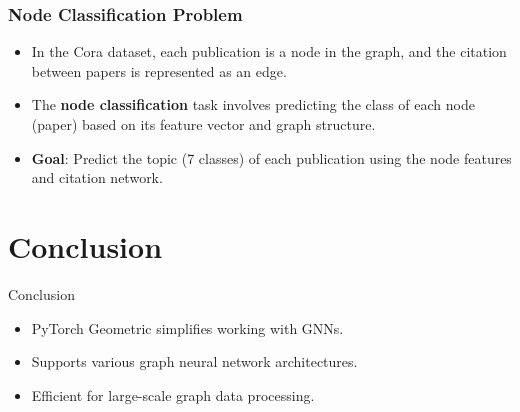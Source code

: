 \documentclass{beamer}
\begin{document}
\begin{frame}
\frametitle{Node Classification Problem}

\begin{itemize}
    \item In the Cora dataset, each publication is a node in the graph, and the citation between papers is represented as an edge.
    \item The \textbf{node classification} task involves predicting the class of each node (paper) based on its feature vector and graph structure.
    \item \textbf{Goal}: Predict the topic (7 classes) of each publication using the node features and citation network.
\end{itemize}

\end{frame}

\section{Conclusion}
\begin{frame}{Conclusion}
    \begin{itemize}
        \item PyTorch Geometric simplifies working with GNNs.
        \item Supports various graph neural network architectures.
        \item Efficient for large-scale graph data processing.
    \end{itemize}
\end{frame}
\end{document}

